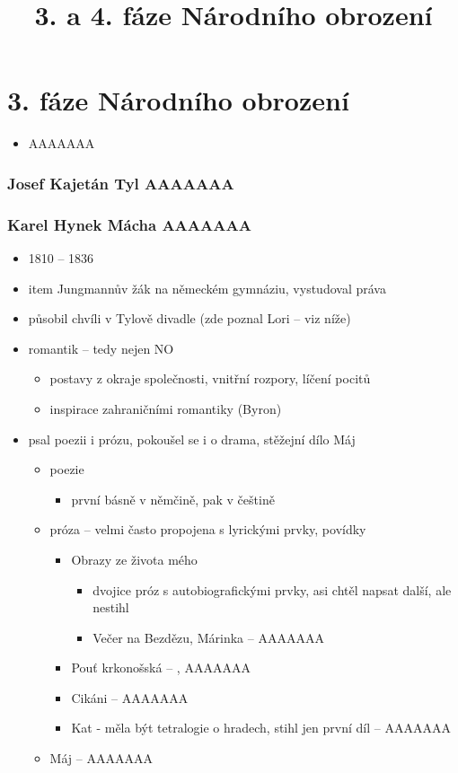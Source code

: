 \documentclass{article}
\title{\vspace{-2cm}3. a 4. fáze Národního obrození\vspace{-1.7cm}}
\date{}
\author{}
\begin{document}
\maketitle

\part{3. fáze Národního obrození}
\begin{itemize}
  \item AAAAAAA
\end{itemize}

\section{Josef Kajetán Tyl AAAAAAA}

\section{Karel Hynek Mácha AAAAAAA}
\begin{itemize}
  \item 1810 -- 1836
  \item item Jungmannův žák na německém gymnáziu, vystudoval práva
  \item působil chvíli v Tylově divadle (zde poznal Lori -- viz níže)
  \item {} romantik -- tedy nejen NO
  \begin{itemize}
    \item postavy z okraje společnosti, vnitřní rozpory, líčení pocitů
    \item inspirace zahraničními romantiky (Byron)
  \end{itemize}
  \item psal poezii i prózu, pokoušel se i o drama, stěžejní dílo Máj
  \begin{itemize}
    \item poezie
    \begin{itemize}
      \item první básně v němčině, pak v češtině
    \end{itemize}
    \item próza -- velmi často propojena s lyrickými prvky, povídky
    \begin{itemize}
      \item Obrazy ze života mého
      \begin{itemize}
        \item dvojice próz s autobiografickými prvky, asi chtěl napsat další, ale nestihl
        \item Večer na Bezdězu, Márinka -- AAAAAAA
      \end{itemize}
      \item Pouť krkonošská -- , AAAAAAA
      \item Cikáni -- AAAAAAA
      \item Kat - měla být tetralogie o hradech, stihl jen první díl -- AAAAAAA
    \end{itemize}
    \item Máj -- AAAAAAA
  \end{itemize}
\end{itemize}
\end{document}
